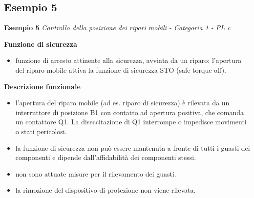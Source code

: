 \subsection{Esempio 5}
\label{sec:08-2-5}
\textbf{Esempio 5}
\textit{Controllo della posizione dei ripari mobili - Categoria 1 - PL c}

\begin{center}
    \begin{minipage}{\textwidth}
        \centering
        \captionsetup{hypcap=false}
        \resizebox{0.6\textwidth}{!}{}
        \label{fig:08-11}
    \end{minipage}
\end{center}

\textbf{Funzione di sicurezza}
\begin{itemize}
    \item funzione di arresto attinente alla sicurezza, avviata da un riparo: l'apertura del riparo mobile attiva la funzione di sicurezza STO (safe torque off).
\end{itemize}

\textbf{Descrizione funzionale}
\begin{itemize}
    \item l'apertura del riparo mobile (ad es. riparo di sicurezza) è rilevata da un interruttore di posizione B1 con contatto ad apertura positiva, che comanda un contattore Q1. La diseccitazione di Q1 interrompe o impedisce movimenti o stati pericolosi.
    \item la funzione di sicurezza non può essere mantenuta a fronte di tutti i guasti dei componenti e dipende dall'affidabilità dei componenti stessi.
    \item non sono attuate misure per il rilevamento dei guasti.
    \item la rimozione del dispositivo di protezione non viene rilevata.
\end{itemize}

